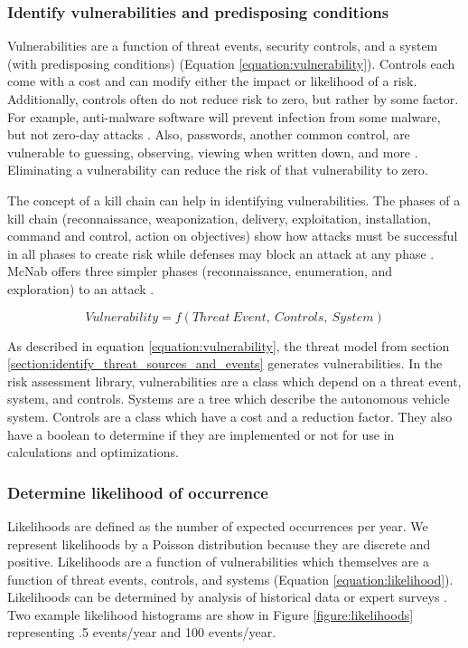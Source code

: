 \documentclass{article}
\begin{document}
\subsubsection{Identify vulnerabilities and predisposing conditions}
Vulnerabilities are a function of threat events, security controls, and a system (with predisposing conditions) (Equation \ref{equation:vulnerability}). Controls each come with a cost and can modify either the impact or likelihood of a risk. Additionally, controls often do not reduce risk to zero, but rather by some factor. For example, anti-malware software will prevent infection from some malware, but not zero-day attacks \citep{vegge_where_2009}. Also, passwords, another common control, are vulnerable to guessing, observing, viewing when written down, and more \citep{bryant_user_2006}. Eliminating a vulnerability can reduce the risk of that vulnerability to zero.

The concept of a kill chain can help in identifying vulnerabilities. The phases of a kill chain (reconnaissance, weaponization, delivery, exploitation, installation, command and control, action on objectives) show how attacks must be successful in all phases to create risk while defenses may block an attack at any phase \citep[page 19]{pols_unified_2017}. McNab offers three simpler phases (reconnaissance, enumeration, and exploration) to an attack \citep{mcnab_network_2007}.

\begin{equation}
    Vulnerability = f(Threat\ Event,\ Controls,\ System)
    \label{equation:vulnerability}
\end{equation}

As described in equation \ref{equation:vulnerability}, the threat model from section \ref{section:identify_threat_sources_and_events} generates vulnerabilities. In the risk assessment library, vulnerabilities are a class which depend on a threat event, system, and controls. Systems are a tree which describe the autonomous vehicle system. Controls are a class which have a cost and a reduction factor. They also have a boolean to determine if they are implemented or not for use in calculations and optimizations.

\subsubsection{Determine likelihood of occurrence}

Likelihoods are defined as the number of expected occurrences per year. We represent likelihoods by a Poisson distribution because they are discrete and positive. Likelihoods are a function of vulnerabilities which themselves are a function of threat events, controls, and systems (Equation \ref{equation:likelihood}). Likelihoods can be determined by analysis of historical data or expert surveys \citep{joh_defining_2017}. Two example likelihood histograms are show in Figure \ref{figure:likelihoods} representing .5 events/year and 100 events/year.
\end{document}
